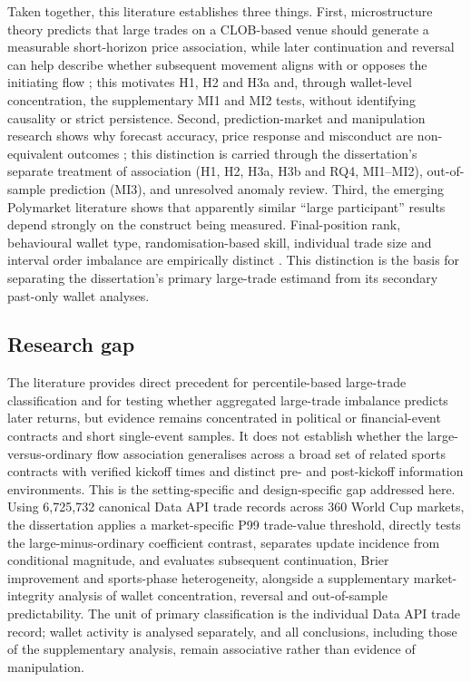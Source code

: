 Taken together, this literature establishes three things. First, microstructure theory predicts that large trades on a CLOB-based venue should generate a measurable short-horizon price association, while later continuation and reversal can help describe whether subsequent movement aligns with or opposes the initiating flow \citep{kyle1985continuous,hasbrouck1991information,madhavan1997prices}; this motivates H1, H2 and H3a and, through wallet-level concentration, the supplementary MI1 and MI2 tests, without identifying causality or strict persistence. Second, prediction-market and manipulation research shows why forecast accuracy, price response and misconduct are non-equivalent outcomes \citep{manski2006interpreting,hanson2006aggregation,aggarwalwu2006manipulation}; this distinction is carried through the dissertation's separate treatment of association (H1, H2, H3a, H3b and RQ4, MI1--MI2), out-of-sample prediction (MI3), and unresolved anomaly review. Third, the emerging Polymarket literature shows that apparently similar ``large participant'' results depend strongly on the construct being measured. Final-position rank, behavioural wallet type, randomisation-based skill, individual trade size and interval order imbalance are empirically distinct \citep{dellavedova2026execution,gomezcram2026minority,cheongtamayo2026concentrated,ng2026pricediscovery}. This distinction is the basis for separating the dissertation's primary large-trade estimand from its secondary past-only wallet analyses.

\subsection{Research gap}
\label{lr:research-gap}

The literature provides direct precedent for percentile-based large-trade classification and for testing whether aggregated large-trade imbalance predicts later returns, but evidence remains concentrated in political or financial-event contracts and short single-event samples. It does not establish whether the large-versus-ordinary flow association generalises across a broad set of related sports contracts with verified kickoff times and distinct pre- and post-kickoff information environments. This is the setting-specific and design-specific gap addressed here. Using 6,725,732 canonical Data API trade records across 360 World Cup markets, the dissertation applies a market-specific P99 trade-value threshold, directly tests the large-minus-ordinary coefficient contrast, separates update incidence from conditional magnitude, and evaluates subsequent continuation, Brier improvement and sports-phase heterogeneity, alongside a supplementary market-integrity analysis of wallet concentration, reversal and out-of-sample predictability. The unit of primary classification is the individual Data API trade record; wallet activity is analysed separately, and all conclusions, including those of the supplementary analysis, remain associative rather than evidence of manipulation.
